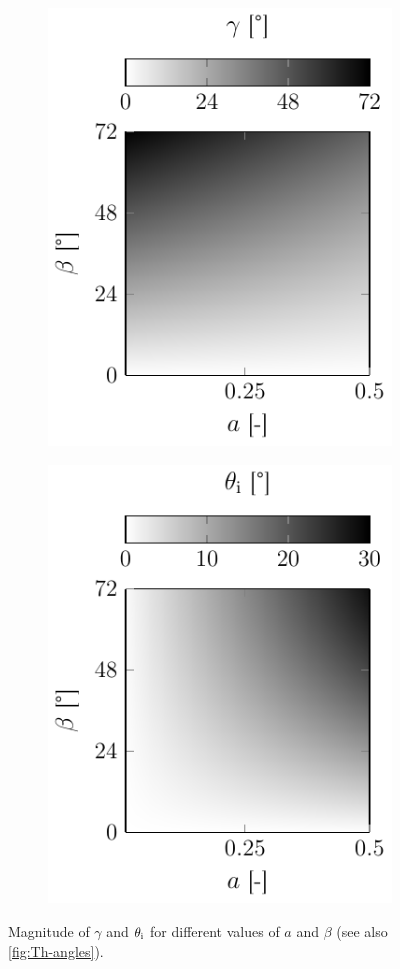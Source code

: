 \begin{figure}
  \centering
  \begin{subfigure}[b]{0.45\textwidth}
    \centering
    \caption{}
    \includegraphics[]{Plots/cache/gamma.pdf}
    \label{fig:Th-gamma}
  \end{subfigure}
  \hfill
  \begin{subfigure}[b]{0.45\textwidth}
    \centering
    \caption{}
    \includegraphics[]{Plots/cache/theta_i.pdf}
    \label{fig:Th-theta_i}
  \end{subfigure}
    \caption{Magnitude of $\gamma$ and $\theta_{\mathrm{i}}$ for different values of $a$ 
    and $\beta$ (see also \cref{fig:Th-angles}).}
  \label{fig:Th-gamma_theta}
\end{figure}

